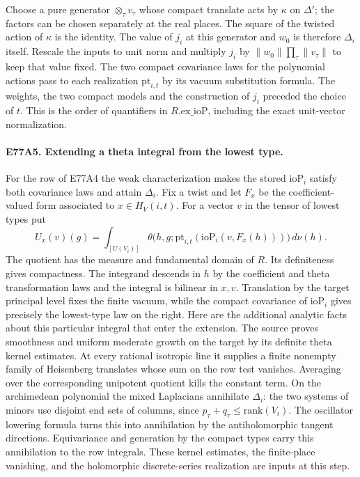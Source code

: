 Choose a pure generator $\otimes_\tau v_\tau$ whose compact translate
acts by $\kappa$ on $\Delta'$; the factors can be chosen separately at
the real places. The square of the twisted action of $\kappa$ is the
identity. The value of $j_i$ at this generator and $w_0$ is therefore
$\Delta_i$ itself. Rescale the inputs to unit norm and multiply $j_i$
by $\|w_0\|\prod_\tau\|v_\tau\|$ to keep that value fixed. The two
compact covariance laws for the polynomial actions pass to each
realization $\mathrm{pt}_{i,t}$ by its vacuum substitution formula.
The weights, the two compact models and the construction of $j_i$
preceded the choice of $t$. This is the order of quantifiers in
$R.\mathrm{ex\_ioP}$, including the exact unit-vector normalization.

\paragraph{E77A5. Extending a theta integral from the lowest type.}
For the row of E77A4 the weak characterization makes the stored
$\mathrm{ioP}_i$ satisfy both covariance laws and attain $\Delta_i$.
Fix a twist and let $F_x$ be the coefficient-valued form associated
to $x\in H_V(i,t)$. For a vector $v$ in the tensor of lowest types
put
\[
 U_x(v)(g)=\int_{[U(V_i)]}\theta\big(h,g;
       \mathrm{pt}_{i,t}(\mathrm{ioP}_i(v,F_x(h)))\big)\,d\nu(h).
\]
The quotient has the measure and fundamental domain of $R$. Its
definiteness gives compactness. The integrand descends in $h$ by
the coefficient and theta transformation laws and the integral is
bilinear in $x,v$. Translation by the target principal level fixes the
finite vacuum, while the compact covariance of $\mathrm{ioP}_i$
gives precisely the lowest-type law on the right. Here are the
additional analytic facts about this particular integral that enter
the extension. The source proves smoothness and uniform moderate growth
on the target by its definite theta kernel estimates. At every rational
isotropic line it supplies a finite nonempty family of Heisenberg
translates whose sum on the row test vanishes. Averaging over the
corresponding unipotent quotient kills the constant term. On the
archimedean polynomial the mixed Laplacians annihilate $\Delta_i$:
the two systems of minors use disjoint end sets of columns, since
$p_\tau+q_\tau\le\mathrm{rank}(V_i)$. The oscillator lowering formula
turns this into annihilation by the antiholomorphic tangent directions.
Equivariance and generation by the compact types carry this annihilation
to the row integrals. These kernel estimates, the finite-place
vanishing, and the holomorphic discrete-series realization are inputs
at this step.


